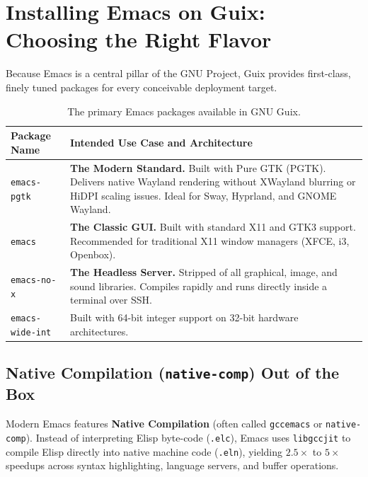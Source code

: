 \section{Installing Emacs on Guix: Choosing the Right Flavor}

Because Emacs is a central pillar of the GNU Project, Guix provides first-class, finely tuned packages for every conceivable deployment target. 

\begin{table}[htbp]
\centering
\small
\begin{tabularx}{\textwidth}{L{0.25\textwidth} Y}
\toprule
\textbf{Package Name} & \textbf{Intended Use Case and Architecture} \\
\midrule
\texttt{emacs-pgtk} & \textbf{The Modern Standard.} Built with Pure GTK (PGTK). Delivers native Wayland rendering without XWayland blurring or HiDPI scaling issues. Ideal for Sway, Hyprland, and GNOME Wayland. \\
\addlinespace
\texttt{emacs} & \textbf{The Classic GUI.} Built with standard X11 and GTK3 support. Recommended for traditional X11 window managers (XFCE, i3, Openbox). \\
\addlinespace
\texttt{emacs-no-x} & \textbf{The Headless Server.} Stripped of all graphical, image, and sound libraries. Compiles rapidly and runs directly inside a terminal over SSH. \\
\addlinespace
\texttt{emacs-wide-int} & Built with 64-bit integer support on 32-bit hardware architectures. \\
\bottomrule
\end{tabularx}
\caption{The primary Emacs packages available in GNU Guix.}
\end{table}

\subsection{Native Compilation (\texttt{native-comp}) Out of the Box}

Modern Emacs features \textbf{Native Compilation} (often called \texttt{gccemacs} or \texttt{native-comp}). Instead of interpreting Elisp byte-code (\texttt{.elc}), Emacs uses \texttt{libgccjit} to compile Elisp directly into native machine code (\texttt{.eln}), yielding $2.5\times$ to $5\times$ speedups across syntax highlighting, language servers, and buffer operations.


